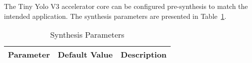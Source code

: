 
The Tiny Yolo V3 accelerator core can be configured pre-synthesis to match the
intended application. The synthesis parameters are presented in
Table~\ref{tab:sp}.

\begin{table}[H]
  \centering
    \begin{tabularx}{\textwidth}{ | c | c | X | }
    \hline
    \rowcolor{iob-green}
    {\bf Parameter} & {\bf Default Value} & {\bf Description} \\\hline

    

    \end{tabularx}
  \caption{Synthesis Parameters}
  \label{tab:sp}
\end{table}
